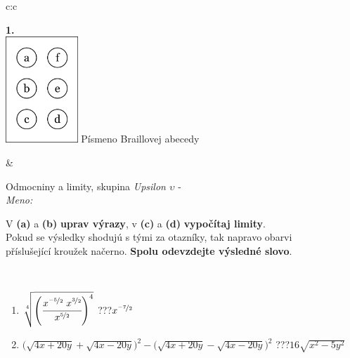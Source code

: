 \documentclass[10pt]{report}
\begin{document}
\begin{tabular}{c:c}
\begin{minipage}[c][104.5mm][t]{0.5\linewidth}
\begin{center}
\begin{minipage}{0.20\linewidth}
\begin{center}
{\Huge\bfseries 1.} \\[2mm]
\includegraphics[height=40mm]{../images/braille.png}
{\small Písmeno Braillovej abecedy}
\end{center}
\end{minipage}
\end{center}
\end{minipage}
&
\begin{minipage}[c][104.5mm][t]{0.5\linewidth}
\begin{center}
\vspace{7mm}
{\huge Odmocniny a limity, skupina \textit{Upsilon $\upsilon$} -}\\[5mm]
\textit{Meno:}\phantom{xxxxxxxxxxxxxxxxxxxxxxxxxxxxxxxxxxxxxxxxxxxxxxxxxxxxxxxxxxxxxxxxx}\\[5mm]
\begin{minipage}{0.95\linewidth}
\begin{center}
V \textbf{(a)} a \textbf{(b)} \textbf{uprav výrazy}, v \textbf{(c)} a \textbf{(d)} \textbf{vypočítaj limity}.\\Pokud se výsledky shodujú s tými za otazníky, tak napravo obarvi\\příslušející kroužek načerno. \textbf{Spolu odevzdejte výsledné slovo}.
\end{center}
\end{minipage}
\\[1mm]
\begin{minipage}{0.79\linewidth}
\begin{center}
\begin{varwidth}{\linewidth}
\begin{enumerate}
\small
\item $\sqrt[4]{\left(\cfrac{x^{\nicefrac{-5}{2}}\;x^{\nicefrac{3}{2}}}{x^{\nicefrac{5}{2}}}\right)^{4}}$\quad \dotfill\; ???\;\dotfill \quad $x^{\nicefrac{-7}{2}}$
\item {\footnotesize{\scriptsize$\big(\sqrt{4x+20y}+\sqrt{4x-20y}\big)^2-\big(\sqrt{4x+20y}-\sqrt{4x-20y}\big)^2$}\quad \dotfill\; ???\;\dotfill \quad $16\sqrt{x^2-5y^2}$}

\end{enumerate}
\end{varwidth}
\end{center}
\end{minipage}
\end{center}
\end{minipage}
\end{tabular}
\end{document}
